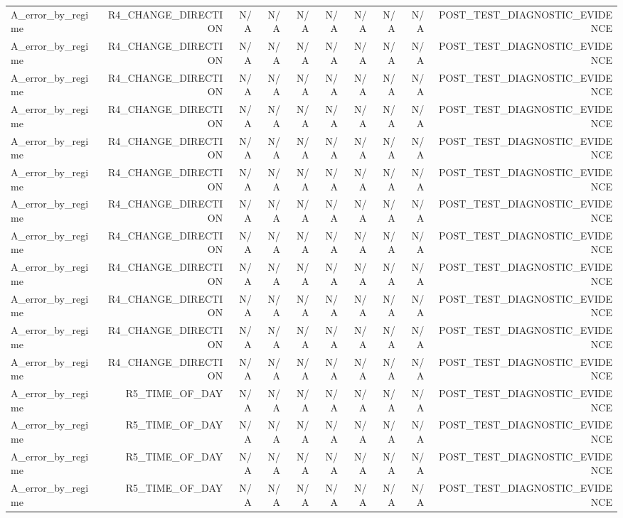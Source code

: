 \begin{table}[h!]
\begin{tabular}{lrrrrrrrrr}
A\_error\_by\_regime & R4\_CHANGE\_DIRECTION & N/A & N/A & N/A & N/A & N/A & N/A & N/A & POST\_TEST\_DIAGNOSTIC\_EVIDENCE \\
A\_error\_by\_regime & R4\_CHANGE\_DIRECTION & N/A & N/A & N/A & N/A & N/A & N/A & N/A & POST\_TEST\_DIAGNOSTIC\_EVIDENCE \\
A\_error\_by\_regime & R4\_CHANGE\_DIRECTION & N/A & N/A & N/A & N/A & N/A & N/A & N/A & POST\_TEST\_DIAGNOSTIC\_EVIDENCE \\
A\_error\_by\_regime & R4\_CHANGE\_DIRECTION & N/A & N/A & N/A & N/A & N/A & N/A & N/A & POST\_TEST\_DIAGNOSTIC\_EVIDENCE \\
A\_error\_by\_regime & R4\_CHANGE\_DIRECTION & N/A & N/A & N/A & N/A & N/A & N/A & N/A & POST\_TEST\_DIAGNOSTIC\_EVIDENCE \\
A\_error\_by\_regime & R4\_CHANGE\_DIRECTION & N/A & N/A & N/A & N/A & N/A & N/A & N/A & POST\_TEST\_DIAGNOSTIC\_EVIDENCE \\
A\_error\_by\_regime & R4\_CHANGE\_DIRECTION & N/A & N/A & N/A & N/A & N/A & N/A & N/A & POST\_TEST\_DIAGNOSTIC\_EVIDENCE \\
A\_error\_by\_regime & R4\_CHANGE\_DIRECTION & N/A & N/A & N/A & N/A & N/A & N/A & N/A & POST\_TEST\_DIAGNOSTIC\_EVIDENCE \\
A\_error\_by\_regime & R4\_CHANGE\_DIRECTION & N/A & N/A & N/A & N/A & N/A & N/A & N/A & POST\_TEST\_DIAGNOSTIC\_EVIDENCE \\
A\_error\_by\_regime & R4\_CHANGE\_DIRECTION & N/A & N/A & N/A & N/A & N/A & N/A & N/A & POST\_TEST\_DIAGNOSTIC\_EVIDENCE \\
A\_error\_by\_regime & R4\_CHANGE\_DIRECTION & N/A & N/A & N/A & N/A & N/A & N/A & N/A & POST\_TEST\_DIAGNOSTIC\_EVIDENCE \\
A\_error\_by\_regime & R4\_CHANGE\_DIRECTION & N/A & N/A & N/A & N/A & N/A & N/A & N/A & POST\_TEST\_DIAGNOSTIC\_EVIDENCE \\
A\_error\_by\_regime & R5\_TIME\_OF\_DAY & N/A & N/A & N/A & N/A & N/A & N/A & N/A & POST\_TEST\_DIAGNOSTIC\_EVIDENCE \\
A\_error\_by\_regime & R5\_TIME\_OF\_DAY & N/A & N/A & N/A & N/A & N/A & N/A & N/A & POST\_TEST\_DIAGNOSTIC\_EVIDENCE \\
A\_error\_by\_regime & R5\_TIME\_OF\_DAY & N/A & N/A & N/A & N/A & N/A & N/A & N/A & POST\_TEST\_DIAGNOSTIC\_EVIDENCE \\
A\_error\_by\_regime & R5\_TIME\_OF\_DAY & N/A & N/A & N/A & N/A & N/A & N/A & N/A & POST\_TEST\_DIAGNOSTIC\_EVIDENCE \\

\end{tabular}
\end{table}
